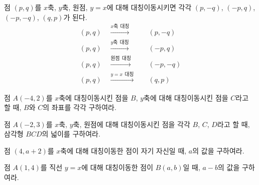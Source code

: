 \documentclass{oblivoir}
\begin{document}
\begin{mdframed}
%
\label{reflect3}
점 \((p,q)\)를 \(x\)축, \(y\)축, 원점, \(y=x\)에 대해 대칭이동시키면 각각 \((p,-q)\), \((-p,q)\), \((-p,-q)\), \((q,p)\)가 된다.
\begin{align*}
(p,q)\quad\xrightarrow{x축\:\:대칭}\quad& (p,-q)\\
(p,q)\quad\xrightarrow{y축\:\:대칭}\quad& (-p,q)\\
(p,q)\quad\xrightarrow{원점\:\:대칭}\quad& (-p,-q)\\
(p,q)\quad\xrightarrow{y=x\:\:대칭}\quad& (q,p)
\end{align*}
\end{mdframed}

%
\exam{}\label{reflect4}
점 \(A(-4,2)\)를 \(x\)축에 대칭이동시킨 점을 \(B\), \(y\)축에 대해 대칭이동시킨 점을 \(C\)라고 할 때, \(B\)와 \(C\)의 좌표를 각각 구하여라.

%
\exam{}\label{reflect5}
점 \(A(-2,3)\)를 \(x\)축, \(y\)축, 원점에 대해 대칭이동시킨 점을 각각 \(B\), \(C\), \(D\)라고 할 때, 삼각형 \(BCD\)의 넓이를 구하여라.

%
\exam{}\label{reflect6}
점 \((4,a+2)\)를 \(x\)축에 대해 대칭이동한 점이 자기 자신일 때, \(a\)의 값을 구하여라.

%
\exam{}\label{reflect7}
점 \(A(1,4)\)를 직선 \(y=x\)에 대해 대칭이동한 점이 \(B(a,b)\)일 때, \(a-b\)의 값을 구하여라.

\newpage
\end{document}
